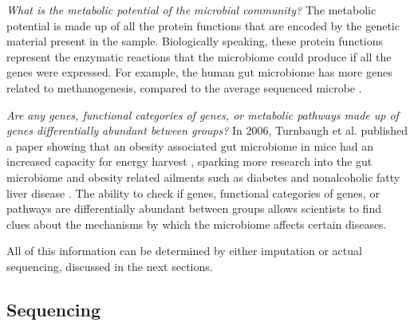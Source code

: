 \textit{What is the metabolic potential of the microbial community?}
The metabolic potential is made up of all the protein functions that are encoded by the genetic material present in the sample. Biologically speaking, these protein functions represent the enzymatic reactions that the microbiome could produce if all the genes were expressed. For example, the human gut microbiome has more genes related to methanogenesis, compared to the average sequenced microbe \cite{gill2006metagenomic}.

\textit{Are any genes, functional categories of genes, or metabolic pathways made up of genes differentially abundant between groups?}
In 2006, Turnbaugh et al. published a paper showing that an obesity associated gut microbiome in mice had an increased capacity for energy harvest \cite{turnbaugh2006obesity}, sparking more research into the gut microbiome and obesity related ailments such as diabetes \cite{larsen2010gut} and nonalcoholic fatty liver disease \cite{zhu2013characterization}. The ability to check if genes, functional categories of genes, or pathways are differentially abundant between groups allows scientists to find clues about the mechanisms by which the microbiome affects certain diseases.

All of this information can be determined by either imputation or actual sequencing, discussed in the next sections.

\subsection{Sequencing}

